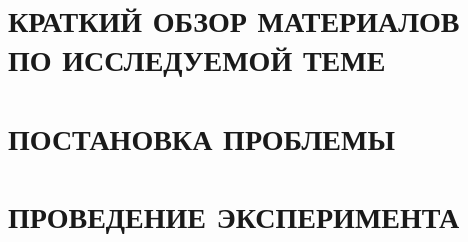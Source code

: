 \documentclass[a4paper, 14pt]{extreport}
\begin{document}
%




\setcounter{page}{4}

\tableofcontents
\newpage



\label{ch:intro}


\chapter[КРАТКИЙ ОБЗОР МАТЕРИАЛОВ]%
{КРАТКИЙ ОБЗОР МАТЕРИАЛОВ ПО ИССЛЕДУЕМОЙ ТЕМЕ}\label{ch:survey}






\chapter{ПОСТАНОВКА ПРОБЛЕМЫ}\label{ch:problem}




\chapter{ПРОВЕДЕНИЕ ЭКСПЕРИМЕНТА}\label{ch:realisation}






\newpage
{}


\newpage
{}
\printbibliography[heading=none]
\end{document}
